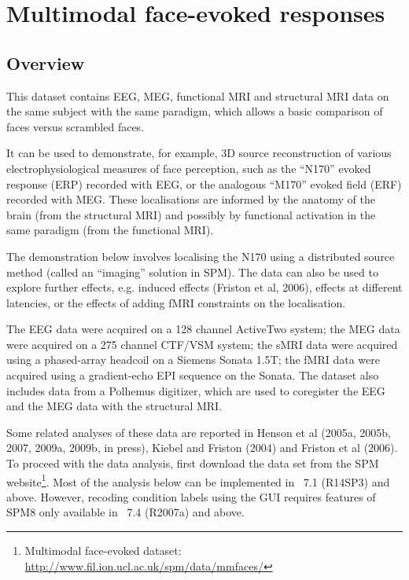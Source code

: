 \chapter{Multimodal face-evoked responses \label{Chap:data:multimodal}}

\section{Overview}

This dataset contains EEG, MEG, functional MRI and structural MRI data on the same subject with the same paradigm, which allows a basic comparison of faces versus scrambled faces.

It can be used to demonstrate, for example, 3D source reconstruction of various electrophysiological measures of face perception, such as the ``N170'' evoked response (ERP) recorded with EEG, or the analogous ``M170'' evoked field (ERF) recorded with MEG. These localisations are informed by the anatomy of the brain (from the structural MRI) and possibly by functional activation in the same paradigm (from the functional MRI).

The demonstration below involves localising the N170 using a distributed source method (called an ``imaging'' solution in SPM). The data can also be used to explore further effects, e.g. induced effects (Friston et al, 2006), effects at different latencies, or the effects of adding fMRI constraints on the localisation.

The EEG data were acquired on a 128 channel ActiveTwo system; the MEG data were acquired on a 275 channel CTF/VSM system; the sMRI data were acquired using a phased-array headcoil on a Siemens Sonata 1.5T; the fMRI data were acquired using a gradient-echo EPI sequence on the Sonata. The dataset also includes data from a Polhemus digitizer, which are used to coregister the EEG and the MEG data with the structural MRI.

Some related analyses of these data are reported in Henson et al (2005a, 2005b, 2007, 2009a, 2009b, in press), Kiebel and Friston (2004) and Friston et al (2006). To proceed with the data analysis, first download the  data set from the SPM website\footnote{Multimodal face-evoked dataset: \url{http://www.fil.ion.ucl.ac.uk/spm/data/mmfaces/}}.
Most of the analysis below can be implemented in \matlab\ 7.1 (R14SP3) and above. However, recoding condition labels using the GUI requires features of SPM8 only available in \matlab\ 7.4 (R2007a) and above.

